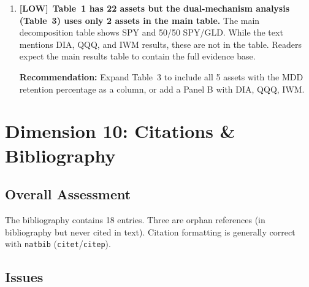 \documentclass[12pt,a4paper]{article}
\newcommand{\LOW}{\textcolor{lowsev}{\textbf{[LOW]}}}
\begin{document}
\begin{enumerate}[label=\textbf{9.\arabic*}]
\textbf{Recommendation:} Provide a formal cost-benefit analysis: quantify the breakeven investor risk aversion ($\gamma$) at which the MDD protection compensates for the Sharpe drag, using a CRRA or prospect theory utility framework.

\item \LOW\ \textbf{Table~1 has 22 assets but the dual-mechanism analysis (Table~3) uses only 2 assets in the main table.}
The main decomposition table shows SPY and 50/50 SPY/GLD. While the text mentions DIA, QQQ, and IWM results, these are not in the table. Readers expect the main results table to contain the full evidence base.

\textbf{Recommendation:} Expand Table~3 to include all 5 assets with the MDD retention percentage as a column, or add a Panel B with DIA, QQQ, IWM.

\end{enumerate}


\section{Dimension 10: Citations \& Bibliography}

\subsection*{Overall Assessment}
The bibliography contains 18 entries. Three are orphan references (in bibliography but never cited in text). Citation formatting is generally correct with \texttt{natbib} (\texttt{citet}/\texttt{citep}).

\subsection*{Issues}
\end{document}
